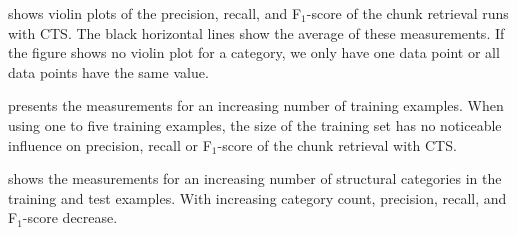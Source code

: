 

 shows violin plots
of the precision,
recall, and F$_{1}$-score of the chunk retrieval runs with CTS.
The black horizontal lines show the average of these measurements.
If the figure shows no violin plot for a category, we only have one
data point or all data points have the same value.

 presents the
measurements for an
increasing number of training examples.
When using one to five
training examples, the size of the training set has no noticeable
influence on precision, recall or F$_{1}$-score of the chunk retrieval
with CTS.

 shows the
measurements for an increasing number of structural categories in the
training and test examples.
With increasing category count, precision,
recall, and F$_{1}$-score decrease.

